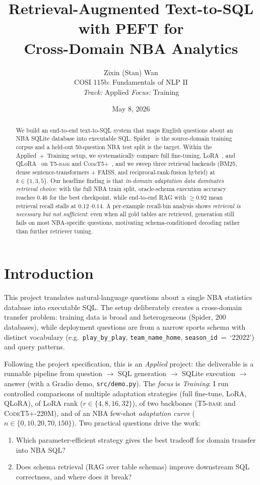 \documentclass[11pt,a4paper]{article}
\title{\bfseries Retrieval-Augmented Text-to-SQL with PEFT for\\
       Cross-Domain NBA Analytics}
\author{Zixin (Stan) Wan\\
        COSI 115b: Fundamentals of NLP II\\
        \textit{Track:} Applied \quad \textit{Focus:} Training}
\date{May 8, 2026}
\newcommand{\codet}{\textsc{CodeT5+}}
\newcommand{\tfive}{\textsc{T5-base}}
\begin{document}
\maketitle

\begin{abstract}
\noindent
We build an end-to-end text-to-SQL system that maps English questions about an
NBA SQLite database into executable SQL. Spider~\cite{yu2018spider} is the
source-domain training corpus and a held-out 50-question NBA test split is the
target. Within the Applied~+~Training setup, we systematically compare full
fine-tuning, LoRA~\cite{hu2022lora}, and QLoRA~\cite{dettmers2023qlora} on
\tfive{} and \codet{}~\cite{wang2021codet5}, and we sweep three retrieval
backends (BM25, dense sentence-transformers + FAISS, and reciprocal-rank-fusion
hybrid) at $k\in\{1,3,5\}$. Our headline finding is that
\emph{in-domain adaptation data dominates retrieval choice}: with the full NBA
train split, oracle-schema execution accuracy reaches $0.46$ for the best
checkpoint, while end-to-end RAG with $\geq 0.92$ mean retrieval recall stalls at
$0.12$--$0.14$. A per-example recall-bin analysis shows \emph{retrieval is
necessary but not sufficient}: even when all gold tables are retrieved,
generation still fails on most NBA-specific questions, motivating
schema-conditioned decoding rather than further retriever tuning.
\end{abstract}

\section{Introduction}
\label{sec:intro}

This project translates natural-language questions about a single
NBA statistics database into executable SQL. The setup deliberately creates a
cross-domain transfer problem: training data is broad and heterogeneous
(Spider, $200$ databases), while deployment questions are from a narrow sports
schema with distinct vocabulary (e.g.\ \texttt{play\_by\_play},
\texttt{team\_name\_home}, \texttt{season\_id}~=~`22022') and query patterns.

Following the project specification, this is an \emph{Applied} project:
the deliverable is a runnable pipeline from question $\to$ SQL generation $\to$
SQLite execution $\to$ answer (with a Gradio demo, \texttt{src/demo.py}). The
\emph{focus} is \emph{Training}: I run controlled comparisons of multiple
adaptation strategies (full fine-tune, LoRA, QLoRA), of LoRA rank
($r\in\{4,8,16,32\}$), of two backbones (\tfive{} and \codet{}-220M), and of an
NBA few-shot \emph{adaptation curve} ($n\in\{0,10,20,70,150\}$). Two practical
questions drive the work:
\begin{enumerate}[leftmargin=*,itemsep=2pt]
\item Which parameter-efficient strategy gives the best tradeoff for domain
      transfer into NBA SQL?
\item Does schema retrieval (RAG over table schemas) improve downstream SQL
      correctness, and where does it break?
\end{enumerate}
\end{document}
